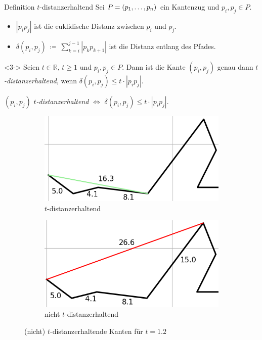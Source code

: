 \documentclass{beamer}
\begin{document}
	\begin{frame}{Definition $t$-distanzerhaltend}
		Sei $P = (p_1, \mathellipsis, p_n)$ ein Kantenzug und $p_i, p_j \in P$.
		\begin{itemize}
			\item<1-> $|p_ip_j|$ ist die euklidische Distanz zwischen $p_i$ und $p_j$.
			\item<2->$\delta(p_i, p_j)~\coloneqq~\sum\limits_{k=i}^{j-1}{|p_kp_{k+1}|}$ ist die Distanz entlang des Pfades.
		\end{itemize}
		\begin{definition}<3->
			Seien $t \in \mathbb{R}$, $t \geq 1$ und $p_i, p_j \in P$. 
			Dann ist die Kante $(p_i, p_j)$ genau dann \emph{$t$-distanzerhaltend}, wenn $\delta(p_i, p_j) \leq t \cdot |p_ip_j|$.
		\end{definition}
		
	\end{frame}
	
	\begin{frame}
		\centering
		$(p_i, p_j)$ \emph{$t$-distanzerhaltend} $\Leftrightarrow$ $\delta(p_i, p_j) \leq t \cdot |p_ip_j|$.
		\vspace{0.5cm}
		\begin{figure}
			\centering
			\begin{subfigure}{.5\textwidth}
				\centering
				\includegraphics[width=0.95\linewidth]{t_distance_preserving_edge_len.png}
				\caption{$t$-distanzerhaltend}

			\end{subfigure}%
			\begin{subfigure}{.5\textwidth}
				\centering
				\includegraphics[width=0.95\linewidth]{not_t_distance_preserving_edge_len.png}
				\caption{nicht $t$-distanzerhaltend}
			\end{subfigure}
			\caption{ (nicht) $t$-distanzerhaltende Kanten für $t = 1.2$}
		\end{figure}
	\end{frame}
	
\end{document}
